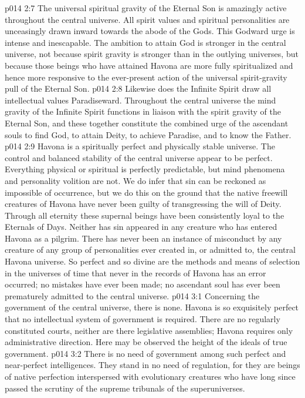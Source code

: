 \vs p014 2:7 The universal spiritual gravity of the Eternal Son is amazingly active throughout the central universe. All spirit values and spiritual personalities are unceasingly drawn inward towards the abode of the Gods. This Godward urge is intense and inescapable. The ambition to attain God is stronger in the central universe, not because spirit gravity is stronger than in the outlying universes, but because those beings who have attained Havona are more fully spiritualized and hence more responsive to the ever\hyp{}present action of the universal spirit\hyp{}gravity pull of the Eternal Son.
\vs p014 2:8 Likewise does the Infinite Spirit draw all intellectual values Paradiseward. Throughout the central universe the mind gravity of the Infinite Spirit functions in liaison with the spirit gravity of the Eternal Son, and these together constitute the combined urge of the ascendant souls to find God, to attain Deity, to achieve Paradise, and to know the Father.
\vs p014 2:9 \pc Havona is a spiritually perfect and physically stable universe. The control and balanced stability of the central universe appear to be perfect. Everything physical or spiritual is perfectly predictable, but mind phenomena and personality volition are not. We do infer that sin can be reckoned as impossible of occurrence, but we do this on the ground that the native freewill creatures of Havona have never been guilty of transgressing the will of Deity. Through all eternity these supernal beings have been consistently loyal to the Eternals of Days. Neither has sin appeared in any creature who has entered Havona as a pilgrim. There has never been an instance of misconduct by any creature of any group of personalities ever created in, or admitted to, the central Havona universe. So perfect and so divine are the methods and means of selection in the universes of time that never in the records of Havona has an error occurred; no mistakes have ever been made; no ascendant soul has ever been prematurely admitted to the central universe.
\vs p014 3:1 Concerning the government of the central universe, there is none. Havona is so exquisitely perfect that no intellectual system of government is required. There are no regularly constituted courts, neither are there legislative assemblies; Havona requires only administrative direction. Here may be observed the height of the ideals of true government.
\vs p014 3:2 There is no need of government among such perfect and near\hyp{}perfect intelligences. They stand in no need of regulation, for they are beings of native perfection interspersed with evolutionary creatures who have long since passed the scrutiny of the supreme tribunals of the superuniverses.
